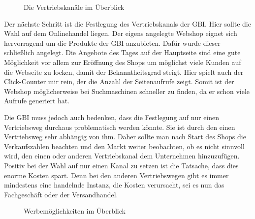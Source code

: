 \begin{figure}[H]
	\begin{center}
	\end{center}
	\caption{Die Vertriebskanäle im Überblick}
\end{figure}

Der nächste Schritt ist die Festlegung des Vertriebskanals der GBI. Hier sollte die Wahl auf dem Onlinehandel liegen. Der eigens angelegte Webshop eignet sich hervorragend um die Produkte der GBI anzubieten. Dafür wurde dieser schließlich angelegt. Die Angebote des Tages auf der Hauptseite sind eine gute Möglichkeit vor allem zur Eröffnung des Shops um möglichst viele Kunden auf die Webseite zu locken, damit der Bekanntheitsgrad steigt. Hier spielt auch der \glqq Click-Counter\grqq{} mir rein, der die Anzahl der Seitenaufrufe zeigt. Somit ist der Webshop möglicherweise bei Suchmaschinen schneller zu finden, da er schon viele Aufrufe generiert hat.

Die GBI muss jedoch auch bedenken, dass die Festlegung auf nur einen Vertriebsweg durchaus problematisch werden könnte. Sie ist durch den einen Vertriebsweg sehr abhängig von ihm. Daher sollte man nach Start des Shops die Verkaufszahlen beachten und den Markt weiter beobachten, ob es nicht sinnvoll wird, den einen oder anderen Vertriebskanal dem Unternehmen hinzuzufügen. Positiv bei der Wahl auf nur einen Kanal zu setzen ist die Tatsache, dass dies enorme Kosten spart. Denn bei den anderen Vertriebswegen gibt es immer mindestens eine handelnde Instanz, die Kosten verursacht, sei es nun das Fachgeschäft oder der Versandhandel.

\begin{figure}[H]
	\begin{center}
	\end{center}
	\caption{Werbemöglichkeiten im Überblick}
\end{figure}

